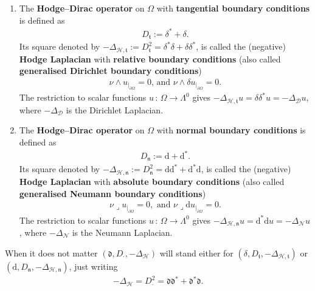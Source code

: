 \documentclass[AHL,Unicode,longabstracts,published]{cedram}
\newcommand{\rmd}{\mathrm{d}}
\newcommand{\clH}{\mathcal{H}}
\newcommand{\clN}{\mathcal{N}}
\newcommand{\clD}{\mathcal{D}}
\newcommand{\fkn}{\mathfrak{n}}
\newcommand{\fkt}{\mathfrak{t}}
\newcommand{\fkd}{\mathfrak{d}}
\newcommand{\iprod}{\mathbin{\lrcorner}}
\newcommand*{\romanenumi}{\renewcommand*{\theenumi}{\roman{enumi}}}
\begin{document}
\pagebreak
\begin{defi}\leavevmode
\begin{enumerate}\romanenumi
\item\label{defi2.1.1} The \textbf{Hodge--Dirac operator} on $\Omega$ with \textbf{tangential boundary conditions} is defined as
\begin{align*}
D_\fkt:= \delta^\ast + \delta .
\end{align*}
Its square denoted by $-\Delta_{\clH,\fkt}:= D_\fkt^2 = \delta^\ast\delta + \delta\delta^\ast$, is called the (negative) \textbf{Hodge Laplacian} with \textbf{relative boundary conditions} (also called \textbf{generalised Dirichlet boundary conditions})
\begin{align*}
\nu\wedge u_{|_{\partial \Omega}} = 0 \text{, and } \nu\wedge \delta u_{|_{\partial \Omega}} = 0.
\end{align*}
The restriction to scalar functions $u\,:\,\Omega\longrightarrow\Lambda^0$ gives $-\Delta_{\clH,\fkt}u = \delta\delta^\ast u = -\Delta_{\clD}u$, where $-\Delta_{\clD}$ is the Dirichlet Laplacian.
\item\label{defi2.1.2} The \textbf{Hodge--Dirac operator} on $\Omega$ with \textbf{normal boundary conditions} is defined as
\begin{align*}
D_\fkn:= \rmd+\rmd^\ast .
\end{align*}
Its square denoted by $-\Delta_{\clH,\fkn}:= D_\fkn^2 = \rmd\rmd^\ast + \rmd^\ast\rmd$, is called the (negative) \textbf{Hodge Laplacian} with \textbf{absolute boundary conditions} (also called \textbf{generalised Neumann boundary conditions})
\begin{align*}
\nu\iprod u_{|_{\partial \Omega}} = 0, \text{ and } \nu\iprod \rmd u_{|_{\partial \Omega}} = 0.
\end{align*}
The restriction to scalar functions $u\,:\,\Omega\longrightarrow\Lambda^0$ gives $-\Delta_{\clH,\fkn}u = \rmd^\ast\rmd u = -\Delta_{\clN}u$, where $-\Delta_{\clN}$ is the Neumann Laplacian.
\end{enumerate}
\end{defi}

\begin{notas}
When it does not matter $(\fkd, D_{\cdot},-\Delta_\clH)$ will stand either for $(\delta, D_\fkt,-\Delta_{\clH,\fkt})$ or $(\rmd, D_\fkn,-\Delta_{\clH,\fkn})$, just writing
\begin{align*}
-\Delta_\clH = D_{\cdot}^2 = \fkd\fkd^\ast+\fkd^\ast\fkd.
\end{align*}
\end{notas}
\end{document}
